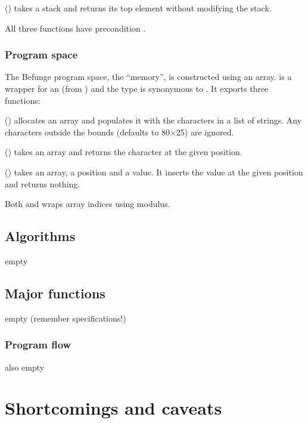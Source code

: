 \documentclass[12pt, a4paper]{article}
\begin{document}
\vspace{6pt}
\noindent
{} () takes a stack and returns its top element without modifying the stack.

\vspace{6pt}
\noindent
All three functions have precondition .

\subsubsection{Program space}
\label{sec:structmem}

The Befunge program space, the “memory”, is constructed using an array.  is a wrapper for an  (from ) and the type  is synonymous to . It exports three functions:

\vspace{6pt}
\noindent
{} () allocates an array and populates it with the characters in a list of strings. Any characters outside the bounds (defaults to 80$\times$25) are ignored.

\vspace{6pt}
\noindent
{} () takes an array and returns the character at the given position.

\vspace{6pt}
\noindent
{} () takes an array, a position and a value. It inserts the value at the given position and returns nothing.

\vspace{6pt}
\noindent
Both  and  wraps array indices using modulus.

\subsection{Algorithms}
\label{sec:algorithms}

empty

\subsection{Major functions}
\label{sec:functions}

empty (remember specifications!)

\subsubsection{Program flow}
\label{sec:flow}

also empty

\section{Shortcomings and caveats}

\vfill



\end{document}
